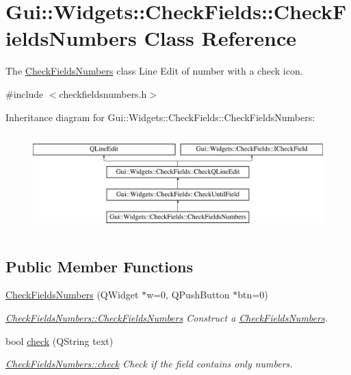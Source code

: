 \hypertarget{classGui_1_1Widgets_1_1CheckFields_1_1CheckFieldsNumbers}{}\section{Gui\+:\+:Widgets\+:\+:Check\+Fields\+:\+:Check\+Fields\+Numbers Class Reference}
\label{classGui_1_1Widgets_1_1CheckFields_1_1CheckFieldsNumbers}


The \hyperlink{classGui_1_1Widgets_1_1CheckFields_1_1CheckFieldsNumbers}{Check\+Fields\+Numbers} class Line Edit of number with a check icon.  




{\ttfamily \#include $<$checkfieldsnumbers.\+h$>$}

Inheritance diagram for Gui\+:\+:Widgets\+:\+:Check\+Fields\+:\+:Check\+Fields\+Numbers\+:\begin{figure}[H]
\begin{center}
\leavevmode
\includegraphics[height=3.848797cm]{d9/daa/classGui_1_1Widgets_1_1CheckFields_1_1CheckFieldsNumbers}
\end{center}
\end{figure}
\subsection*{Public Member Functions}
\begin{DoxyCompactItemize}
\item 
\hyperlink{classGui_1_1Widgets_1_1CheckFields_1_1CheckFieldsNumbers_ab0af4f695b33792c28ce37cf27aea6cf}{Check\+Fields\+Numbers} (Q\+Widget $\ast$w=0, Q\+Push\+Button $\ast$btn=0)
\begin{DoxyCompactList}\small\item\em \hyperlink{classGui_1_1Widgets_1_1CheckFields_1_1CheckFieldsNumbers_ab0af4f695b33792c28ce37cf27aea6cf}{Check\+Fields\+Numbers\+::\+Check\+Fields\+Numbers} Construct a \hyperlink{classGui_1_1Widgets_1_1CheckFields_1_1CheckFieldsNumbers}{Check\+Fields\+Numbers}. \end{DoxyCompactList}\item 
bool \hyperlink{classGui_1_1Widgets_1_1CheckFields_1_1CheckFieldsNumbers_ade88f674fc2cbbeb514cdf81c0f63487}{check} (Q\+String text)
\begin{DoxyCompactList}\small\item\em \hyperlink{classGui_1_1Widgets_1_1CheckFields_1_1CheckFieldsNumbers_ade88f674fc2cbbeb514cdf81c0f63487}{Check\+Fields\+Numbers\+::check} Check if the field contains only numbers. \end{DoxyCompactList}\end{DoxyCompactItemize}
